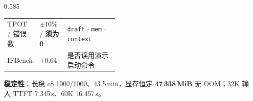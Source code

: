\documentclass[aspectratio=169,10pt,UTF8]{beamer}
\newcommand{\NumVRAM}{47\,338}
\newcommand{\body}[1]{\par{\fontsize{8.7}{11.3}\selectfont #1}\par}
\begin{document}
\begin{frame}[t]
\begin{columns}[T,onlytextwidth]
\begin{column}{0.585\linewidth}
{\begin{tabularx}{\linewidth}{@{}>{\raggedright\arraybackslash}p{0.20\linewidth} >{\raggedright\arraybackslash}p{0.25\linewidth} X@{}}
        TPOT / 错误数 & $\pm10\%$ / \textbf{须为 0} & \texttt{draft} $\cdot$ \texttt{mem} $\cdot$ \texttt{context} \\
        IFBench & $\pm0.04$ & 是否误用演示启动命令 \\
        \bottomrule
      \end{tabularx}}\par
      \vspace{3pt}
      \body{\textbf{稳定性}：长稳 c8 1000/1000、43.5\,min，显存恒定 \textbf{\NumVRAM\,MiB} 无 OOM；32K 输入 TTFT 7.345\,s、60K 16.457\,s。\par}
    \end{column}
  \end{columns}

\end{frame}
\end{document}
